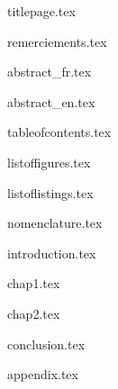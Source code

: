 \documentclass[%
    paper=A4,               %
    twoside=true,           %
    openright,              %
    chapterprefix=true,     %
    12pt,                   %
    headings=normal,        %
    bibliography=totoc,     %
    titlepage=on,           %
    captions=tableabove,    %
    draft=false             %
]{book}%
\begin{document}
\nocite{*}

{titlepage.tex}




{remerciements.tex}\clearpage{}

{abstract_fr.tex}\clearpage{}

{abstract_en.tex}\clearpage{}

{tableofcontents.tex}\clearpage{}

{listoffigures.tex}\clearpage{}

{listoflistings.tex}\clearpage{}

{nomenclature.tex}\clearpage{}




{introduction.tex}

{chap1.tex}

{chap2.tex}

{conclusion.tex}



{appendix.tex}



\thispagestyle{frontmatterstyle}\pagestyle{frontmatterstyle}
\backmatter{}
\clearpage{}

\printbibliography[
    heading=bibliography
]
\end{document}
